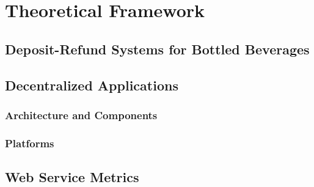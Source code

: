 
\chapter{Theoretical Framework}
\label{chp:theoreticalFramework}

\section{Deposit-Refund Systems for Bottled Beverages}


\section{Decentralized Applications}

\subsection{Architecture and Components}
\subsection{Platforms}

\section{Web Service Metrics}